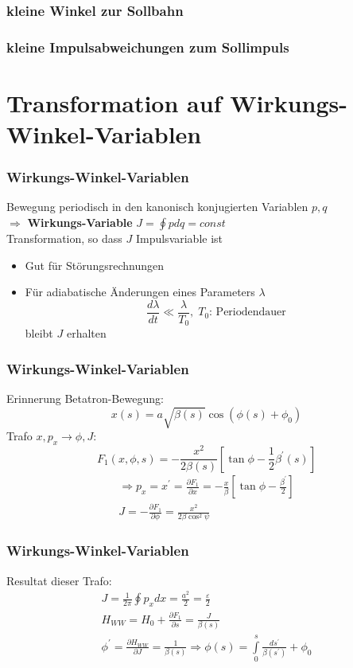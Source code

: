\documentclass[hyperref={pdfpagelabels=false}]{beamer}
\begin{document}
\begin{frame}
 \frametitle{kleine Winkel zur Sollbahn}
\end{frame}

\begin{frame}
 \frametitle{kleine Impulsabweichungen zum Sollimpuls}
\end{frame}

\section{Transformation auf Wirkungs-Winkel-Variablen}
\begin{frame}
\frametitle{Wirkungs-Winkel-Variablen}
Bewegung periodisch in den kanonisch konjugierten Variablen $p,q$\\
$\Rightarrow$\textbf{ Wirkungs-Variable} $J = \oint p dq = const$\\
\vspace*{.7cm}\pause
Transformation, so dass $J$ Impulsvariable ist \begin{itemize}\item Gut für Störungsrechnungen  \item Für adiabatische Änderungen eines Parameters $\lambda$
\begin{equation*}
\frac{d\lambda }{dt} \ll \frac{\lambda}{T_0},\; T_0\text{: Periodendauer}
\end{equation*}
bleibt $J$ erhalten
\end{itemize}
\end{frame}
\begin{frame}
\frametitle{Wirkungs-Winkel-Variablen}
Erinnerung Betatron-Bewegung:
\begin{equation*}
x(s) = a \sqrt{\beta(s)} \cos (\phi(s) + \phi_0)
\end{equation*}
\pause
Trafo $x,p_x\rightarrow \phi,J$:
\begin{equation*}
F_1(x,\phi,s) = -\frac{x^2}{2\beta(s)}\left[ \tan \phi - \frac{1}{2}\beta^\prime(s)\right]
\end{equation*}\pause
\begin{gather*}\Rightarrow p_x = x^\prime = \frac{\partial F_1}{\partial x} = -\frac{x}{\beta}\left[\tan \phi - \frac{\beta^\prime}{2}\right]\\
J = - \frac{\partial F_1}{\partial \phi} = \frac{x^2}{2\beta\cos^2\psi}
\end{gather*}
\end{frame}

\begin{frame}
\frametitle{Wirkungs-Winkel-Variablen}
Resultat dieser Trafo:
\begin{gather*}
J = \frac{1}{2\pi} \oint p_x dx= \frac{a^2}{2} = \frac{\varepsilon}{2}\\
H_{WW} = H_0 + \frac{\partial F_1}{\partial s} =  \frac{J}{\beta(s)}\\
\phi^\prime = \frac{\partial H_{WW}}{\partial J} = \frac{1}{\beta(s)} \Rightarrow \phi(s) = \int\limits_{0}^s \frac{ds^\prime}{\beta(s^\prime)} + \phi_0
\end{gather*}
\end{frame}
\end{document}
